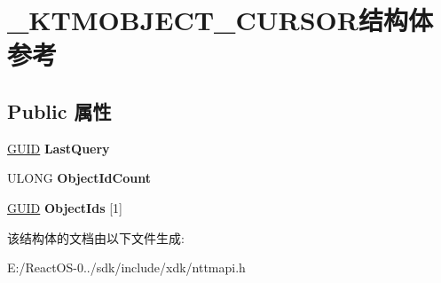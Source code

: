 \hypertarget{struct___k_t_m_o_b_j_e_c_t___c_u_r_s_o_r}{}\section{\+\_\+\+K\+T\+M\+O\+B\+J\+E\+C\+T\+\_\+\+C\+U\+R\+S\+O\+R结构体 参考}
\label{struct___k_t_m_o_b_j_e_c_t___c_u_r_s_o_r}
\subsection*{Public 属性}
\begin{DoxyCompactItemize}
\item 
\mbox{\label{struct___k_t_m_o_b_j_e_c_t___c_u_r_s_o_r_a27233d1536f0b44e242bc7b6ec4c7d32}} 
\hyperlink{interface_g_u_i_d}{G\+U\+ID} {\bfseries Last\+Query}
\item 
\mbox{\label{struct___k_t_m_o_b_j_e_c_t___c_u_r_s_o_r_a7c6cd8512e53a2bcfa9db5c492fffd41}} 
U\+L\+O\+NG {\bfseries Object\+Id\+Count}
\item 
\mbox{\label{struct___k_t_m_o_b_j_e_c_t___c_u_r_s_o_r_a1153f1dd03fe8d672133bc82ca88ed15}} 
\hyperlink{interface_g_u_i_d}{G\+U\+ID} {\bfseries Object\+Ids} \mbox{[}1\mbox{]}
\end{DoxyCompactItemize}


该结构体的文档由以下文件生成\+:\begin{DoxyCompactItemize}
\item 
E\+:/\+React\+O\+S-\/0../sdk/include/xdk/nttmapi.\+h\end{DoxyCompactItemize}
